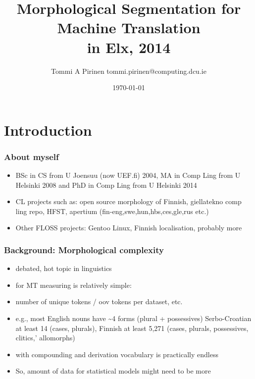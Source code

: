 \documentclass{beamer}
\title{Morphological Segmentation for Machine Translation\\
\scriptsize{in Elx, 2014}}
\author{Tommi A Pirinen \scriptsize \guilsinglleft{}tommi.pirinen@computing.dcu.ie\guilsinglright{}}
\institute{DCU, CNGL\\Abumatran}
\date{\today}
\begin{document}

\maketitle

\section{Introduction}

\begin{frame}
    \frametitle{About myself}
    \begin{itemize}
        \item BSc in CS from U Joensuu (now UEF.fi) 2004, 
            MA in Comp Ling from U Helsinki 2008
            and PhD in Comp Ling from U Helsinki 2014
        \item CL projects such as:
            open source morphology of Finnish,
            giellatekno comp ling repo,
            HFST,
            apertium (fin-{eng,swe,hun,hbs,ces,gle,rus} etc.)
        \item Other FLOSS projects:
            Gentoo Linux,
            Finnish localisation,
            probably more
    \end{itemize}
\end{frame}

\begin{frame}
    \frametitle{Background: Morphological complexity}
    \begin{itemize}
        \item debated, hot topic in linguistics
        \item for MT measuring is relatively simple:
        \item number of unique tokens / oov tokens per dataset, etc.
        \item e.g., most English nouns have \textasciitilde 4 forms (plural + possessives)
            Serbo-Croatian at least 14 (cases, plurals), 
            Finnish at least 5,271 (cases, plurals, possessives, clitics,'
            allomorphs)
        \item with compounding and derivation vocabulary is practically endless
        \item So, amount of data for statistical models might need to be more

    \end{itemize}
\end{frame}
\end{document}

